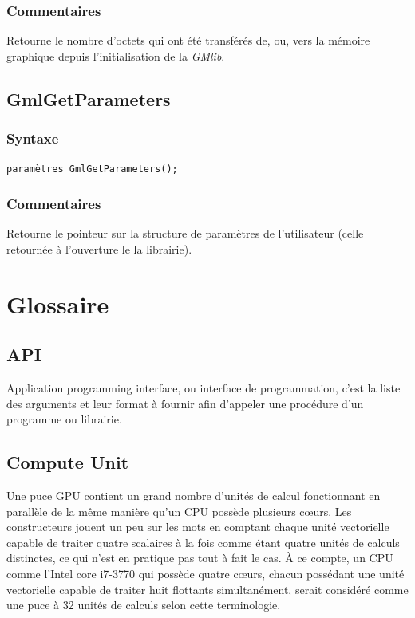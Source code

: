 \documentclass[a4paper,12pt]{article}
\begin{document}
\subsubsection*{Commentaires}
Retourne le nombre d'octets qui ont été transférés de, ou, vers la mémoire graphique depuis l'initialisation de la \emph{GMlib}.


\subsection{GmlGetParameters}
\subsubsection*{Syntaxe}
{\tt paramètres GmlGetParameters();}
\subsubsection*{Commentaires}
Retourne le pointeur sur la structure de paramètres de l'utilisateur (celle retournée à l'ouverture le la librairie).


%
%


\section{Glossaire}

\subsection{API}
Application programming interface, ou interface de programmation, c'est la liste des arguments et leur format à fournir afin d'appeler une procédure d'un programme ou librairie.

\subsection{Compute Unit}
Une puce GPU contient un grand nombre d'unités de calcul fonctionnant en parallèle de la même manière qu'un CPU possède plusieurs c\oe urs. Les constructeurs jouent un peu sur les mots en comptant chaque unité vectorielle capable de traiter quatre scalaires à la fois comme étant quatre unités de calculs distinctes, ce qui n'est en pratique pas tout à fait le cas. À ce compte, un CPU comme l'Intel core i7-3770 qui possède quatre c\oe urs, chacun possédant une unité vectorielle capable de traiter huit flottants simultanément, serait considéré comme une puce à 32 unités de calculs selon cette terminologie.
\end{document}
